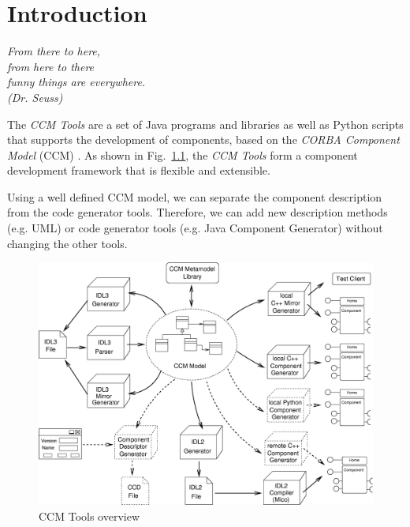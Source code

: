 
\chapter{Introduction}
\begin{flushright}
{\it From there to here, \\
     from here to there \\
     funny things are everywhere.\\
		(Dr. Seuss)}

\end{flushright}


The {\it CCM Tools} are a set of Java programs and libraries as well as Python
scripts that supports the development of components, based on the {\it CORBA
Component Model} (CCM) \cite{CCMSpecification}. As shown in Fig.~\ref{ccmtools},
the {\it CCM Tools} form a component development framework that is flexible and
extensible.

Using a well defined CCM model, we can separate the component description from
the code generator tools. Therefore, we can add new description methods (e.g.
UML) or code generator tools (e.g. Java Component Generator) without changing
the other tools.


\begin{figure}[htbp]
    \begin{center}
        \includegraphics [width=12cm,angle=0] {ComponentGeneratorTools}
        \caption{CCM Tools overview}
        \label{ccmtools}
    \end{center}
\end{figure}

